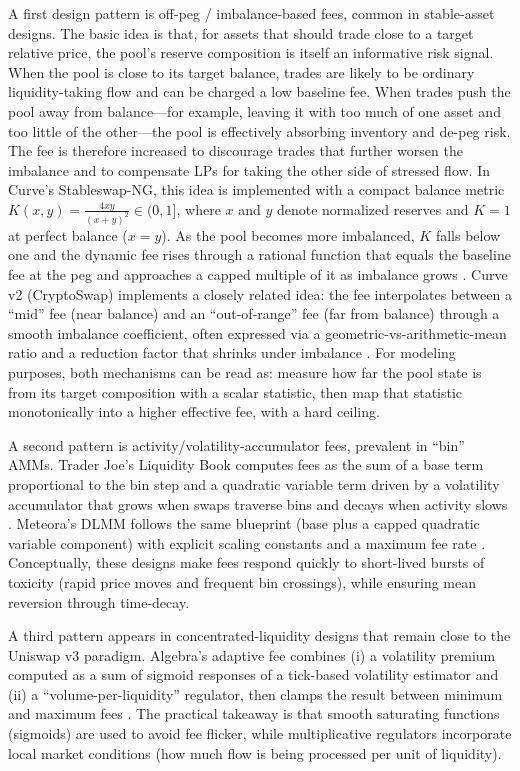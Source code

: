 \documentclass[11pt]{article}
\begin{document}
A first design pattern is off-peg / imbalance-based fees, common in stable-asset designs. The basic idea is that, for assets that should trade close to a target relative price, the pool's reserve composition is itself an informative risk signal. When the pool is close to its target balance, trades are likely to be ordinary liquidity-taking flow and can be charged a low baseline fee. When trades push the pool away from balance---for example, leaving it with too much of one asset and too little of the other---the pool is effectively absorbing inventory and de-peg risk. The fee is therefore increased to discourage trades that further worsen the imbalance and to compensate LPs for taking the other side of stressed flow. In Curve's Stableswap-NG, this idea is implemented with a compact balance metric
$K(x,y)=\frac{4xy}{(x+y)^2}\in(0,1]$, where $x$ and $y$ denote normalized reserves and $K=1$ at perfect balance ($x=y$). As the pool becomes more imbalanced, $K$ falls below one and the dynamic fee rises through a rational function that equals the baseline fee at the peg and approaches a capped multiple of it as imbalance grows \cite{curve_stableswap_ng}. Curve v2 (CryptoSwap) implements a closely related idea: the fee interpolates between a ``mid'' fee (near balance) and an ``out-of-range'' fee (far from balance) through a smooth imbalance coefficient, often expressed via a geometric-vs-arithmetic-mean ratio and a reduction factor that shrinks under imbalance \cite{curve_cryptoswap_whitepaper}. For modeling purposes, both mechanisms can be read as: measure how far the pool state is from its target composition with a scalar statistic, then map that statistic monotonically into a higher effective fee, with a hard ceiling.

A second pattern is activity/volatility-accumulator fees, prevalent in ``bin'' AMMs. Trader Joe's Liquidity Book computes fees as the sum of a base term proportional to the bin step and a quadratic variable term driven by a volatility accumulator that grows when swaps traverse bins and decays when activity slows \cite{lfj_fees}. Meteora's DLMM follows the same blueprint (base plus a capped quadratic variable component) with explicit scaling constants and a maximum fee rate \cite{meteora_dlmm_docs}. Conceptually, these designs make fees respond quickly to short-lived bursts of toxicity (rapid price moves and frequent bin crossings), while ensuring mean reversion through time-decay.

A third pattern appears in concentrated-liquidity designs that remain close to the Uniswap v3 paradigm. Algebra's adaptive fee combines (i) a volatility premium computed as a sum of sigmoid responses of a tick-based volatility estimator and (ii) a ``volume-per-liquidity'' regulator, then clamps the result between minimum and maximum fees \cite{algebra_adaptive_fee_docs,algebra_tech_paper}. The practical takeaway is that smooth saturating functions (sigmoids) are used to avoid fee flicker, while multiplicative regulators incorporate local market conditions (how much flow is being processed per unit of liquidity).
\end{document}
